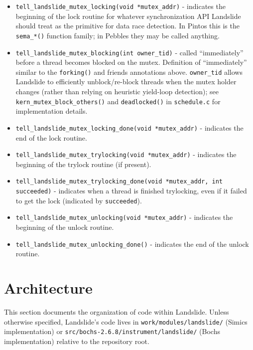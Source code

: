 \begin{itemize}
	\item {\tt tell\_landslide\_mutex\_locking(void *mutex\_addr)} - indicates the beginning of the lock routine for
		whatever synchronization API Landslide should treat as the primitive for data race detection.
		In Pintos this is the {\tt sema\_*()} function family; in Pebbles they may be called anything.
	\item {\tt tell\_landslide\_mutex\_blocking(int owner\_tid)} - called ``immediately'' before a thread becomes blocked on the mutex.
		Definition of ``immediately'' similar to the {\tt forking()} and friends annotations above.
		{\tt owner\_tid} allows Landslide to efficiently unblock/re-block threads when the mutex holder changes
		(rather than relying on heuristic yield-loop detection);
		see {\tt kern\_mutex\_block\_others()} and {\tt deadlocked()} in {\tt schedule.c} for implementation details.
	\item {\tt tell\_landslide\_mutex\_locking\_done(void *mutex\_addr)} - indicates the end of the lock routine.
	\item {\tt tell\_landslide\_mutex\_trylocking(void *mutex\_addr)} - indicates the beginning of the trylock routine (if present).
	\item {\tt tell\_landslide\_mutex\_trylocking\_done(void *mutex\_addr, int succeeded)} -
		indicates when a thread is finished trylocking, even if it failed to get the lock (indicated by {\tt succeeded}).
	\item {\tt tell\_landslide\_mutex\_unlocking(void *mutex\_addr)} - indicates the beginning of the unlock routine.
	\item {\tt tell\_landslide\_mutex\_unlocking\_done()} - indicates the end of the unlock routine.
\end{itemize}


\section{Architecture}

This section documents the organization of code within Landslide.
Unless otherwise specified, Landslide's code lives in
{\tt work/modules/landslide/} (Simics implementation) or {\tt src/bochs-2.6.8/instrument/landslide/} (Bochs implementation)
relative to the repository root.

